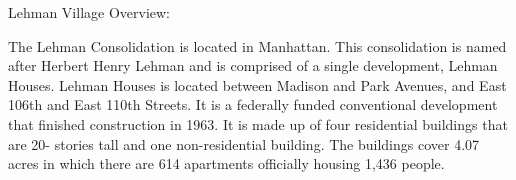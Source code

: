 Lehman Village Overview:     

   

The Lehman Consolidation is located in Manhattan. This consolidation is named after Herbert Henry Lehman and is comprised of a single development, Lehman Houses. Lehman Houses is located between Madison and Park Avenues, and East 106th and East 110th Streets. It is a federally funded conventional development that finished construction in 1963. It is made up of four residential buildings that are 20- stories tall and one non-residential building. The buildings cover 4.07 acres in which there are 614 apartments officially housing 1,436 people. 